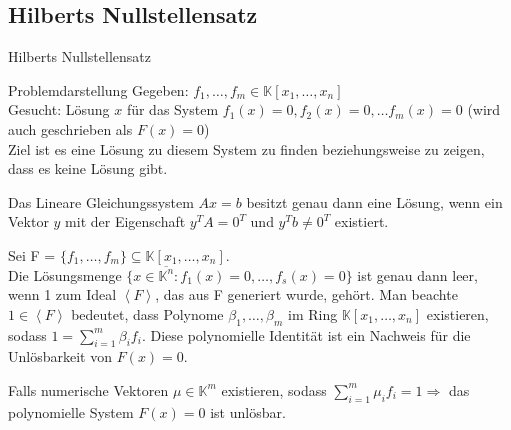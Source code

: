 \subsection{Hilberts Nullstellensatz}
\begin{mslide}{Hilberts Nullstellensatz}

\begin{block}{Problemdarstellung}
Gegeben: $f_1,\ldots,f_m \in \mathbb{K}[x_1,\ldots,x_n]$ \\
Gesucht: Lösung $x$ für das System $f_1(x) = 0, f_2(x) = 0, \ldots f_m(x) = 0$ (wird auch geschrieben als $F(x) = 0$) \\
Ziel ist es eine Lösung zu diesem System zu finden beziehungsweise zu zeigen, dass es keine Lösung gibt. \\
\end{block}


\begin{thm} \label{Fredi}
Das Lineare Gleichungssystem $Ax=b$ besitzt genau dann eine Lösung, wenn ein Vektor $y$ mit der Eigenschaft $y^TA=0^T$ und $y^Tb\neq 0^T$ existiert. 
\end{thm}

\framebreak

\begin{thm} 
Sei F = $\{f_1,\ldots,f_m\} \subseteq \mathbb{K}[x_1,\ldots,x_n]$.\\
Die Lösungsmenge $\{x \in \overline{\mathbb{K}^n} : f_1(x)=0,\ldots,f_s(x)=0\}$ ist genau dann leer, wenn 1 zum Ideal $\left\langle F \right\rangle$, das aus F generiert wurde, gehört. Man beachte $1 \in \left\langle F \right\rangle$ bedeutet, dass Polynome $\beta_1,\ldots,\beta_m$ im Ring $\mathbb{K}[x_1,\ldots,x_n]$ existieren, sodass $1 = \sum_{i=1}^m \beta_i f_i$. Diese polynomielle Identität ist ein Nachweis für die Unlösbarkeit von $F(x) = 0$. 
\end{thm}

\begin{kor}
Falls numerische Vektoren $\mu \in \mathbb{K}^m$ existieren, sodass $\sum_{i=1}^m \mu_i f_i = 1 \Rightarrow $ das polynomielle System $F(x) = 0$ ist unlösbar. 
\end{kor}

\framebreak


\end{mslide}
